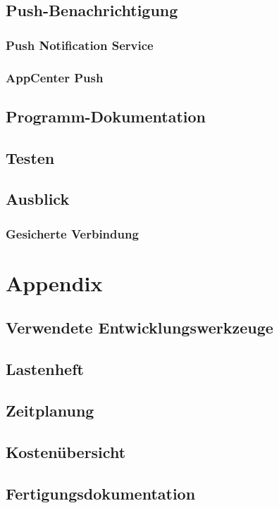 \documentclass[a4paper, 12pt, twoside, openright
]{memoir}
\newcommand{\AndreasGrain}{Andreas Grain}
\newcommand{\MatthiasMair}{Matthias Mair}
\newcommand{\authorName}{\AndreasGrain / \MatthiasMair}
\begin{document}
\chapter{Push-Benachrichtigung}
\label{ch:push}
\section{Push Notification Service}
\section{AppCenter Push}
\chapter{Programm-Dokumentation}

\chapter{Testen}
\chapter{Ausblick}
\section{Gesicherte Verbindung}%
\cleartoverso

\renewcommand{\authorName}{\AndreasGrain / \MatthiasMair}
\appendix
\printbibliography\clearpage
\printacronyms[heading=chapter*,name=Abkürzungen]\clearpage
\listoffigures\clearpage
\listoftables\clearpage

\part{Appendix}
\chapter{Verwendete Entwicklungswerkzeuge}
\chapter{Lastenheft}
\chapter{Zeitplanung}
\chapter{Kostenübersicht}
\chapter{Fertigungsdokumentation}
\end{document}
